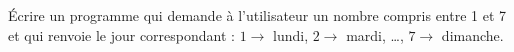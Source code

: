 
Écrire un programme qui demande à l'utilisateur un nombre compris entre 1 et 7 et qui renvoie le jour correspondant : $1 \longrightarrow$ lundi, $2 \longrightarrow$ mardi, \ldots, $7 \longrightarrow$ dimanche.